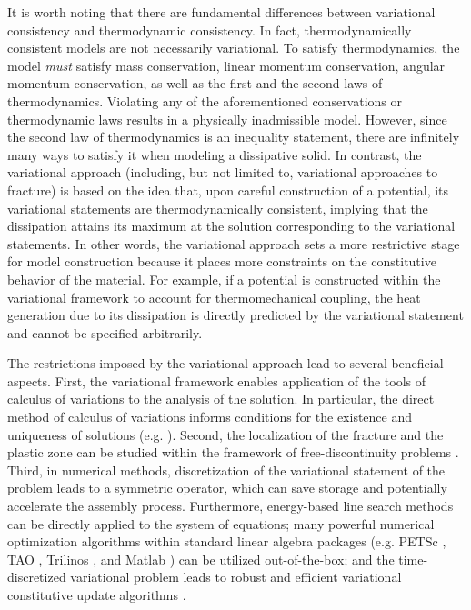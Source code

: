 It is worth noting that there are fundamental differences between variational consistency and thermodynamic consistency. In fact, thermodynamically consistent models are not necessarily variational. To satisfy thermodynamics, the model \emph{must} satisfy mass conservation, linear momentum conservation, angular momentum conservation, as well as the first and the second laws of thermodynamics. Violating any of the aforementioned conservations or thermodynamic laws results in a physically inadmissible model. However, since the second law of thermodynamics is an inequality statement, there are infinitely many ways to satisfy it when modeling a dissipative solid. In contrast, the variational approach (including, but not limited to, variational approaches to fracture) is based on the idea that, upon careful construction of a potential, its variational statements are thermodynamically consistent, implying that the dissipation attains its maximum at the solution corresponding to the variational statements. In other words, the variational approach sets a more restrictive stage for model construction because it places more constraints on the constitutive behavior of the material. For example, if a potential is constructed within the variational framework to account for thermomechanical coupling, the heat generation due to its dissipation is directly predicted by the variational statement and cannot be specified arbitrarily.

The restrictions imposed by the variational approach lead to several beneficial aspects. First, the variational framework enables application of the tools of calculus of variations to the analysis of the solution. In particular, the direct method of calculus of variations informs conditions for the existence and uniqueness of solutions (e.g. \cite{dal2012introduction}). Second, the localization of the fracture and the plastic zone can be studied within the framework of free-discontinuity problems \cite{braides1998approximation,gariepy2001functions}. Third, in numerical methods, discretization of the variational statement of the problem leads to a symmetric operator, which can save storage and potentially accelerate the assembly process. Furthermore, energy-based line search methods can be directly applied to the system of equations; many powerful numerical optimization algorithms within standard linear algebra packages (e.g. PETSc \cite{petsc-web-page}, TAO \cite{benson2003tao}, Trilinos \cite{heroux2005overview}, and Matlab \cite{higham2016matlab}) can be utilized out-of-the-box; and the time-discretized variational problem leads to robust and efficient variational constitutive update algorithms \cite{ortiz_1999}.

